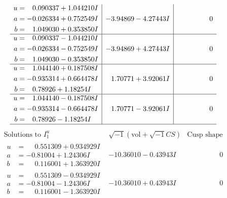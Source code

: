 \documentclass[1p]{elsarticle_modified}
\theoremstyle{definition}
\newcommand{\I}{\sqrt{-1}}
\begin{document}
$$\begin{array}{c|c|c}
\begin{aligned}
u &= \phantom{-}0.090337 + 1.044210 I \\
a &= -0.026334 + 0.752549 I \\
b &= \phantom{-}1.049030 + 0.353850 I\end{aligned}
 & -3.94869 - 4.27443 I & \phantom{-0.000000 } 0 \\ \hline\begin{aligned}
u &= \phantom{-}0.090337 - 1.044210 I \\
a &= -0.026334 - 0.752549 I \\
b &= \phantom{-}1.049030 - 0.353850 I\end{aligned}
 & -3.94869 + 4.27443 I & \phantom{-0.000000 } 0 \\ \hline\begin{aligned}
u &= \phantom{-}1.044140 + 0.187508 I \\
a &= -0.935314 + 0.664478 I \\
b &= \phantom{-}0.78926 + 1.18254 I\end{aligned}
 & \phantom{-}1.70771 + 3.92061 I & \phantom{-0.000000 } 0 \\ \hline\begin{aligned}
u &= \phantom{-}1.044140 - 0.187508 I \\
a &= -0.935314 - 0.664478 I \\
b &= \phantom{-}0.78926 - 1.18254 I\end{aligned}
 & \phantom{-}1.70771 - 3.92061 I & \phantom{-0.000000 } 0\\
 \hline 
 \end{array}$$\newpage$$\begin{array}{c|c|c}  
\text{Solutions to }I^u_{1}& \I (\text{vol} + \sqrt{-1}CS) & \text{Cusp shape}\\
 \hline 
\begin{aligned}
u &= \phantom{-}0.551309 + 0.934929 I \\
a &= -0.81004 + 1.24306 I \\
b &= \phantom{-}0.116001 + 1.363920 I\end{aligned}
 & -10.36010 - 0.43943 I & \phantom{-0.000000 } 0 \\ \hline\begin{aligned}
u &= \phantom{-}0.551309 - 0.934929 I \\
a &= -0.81004 - 1.24306 I \\
b &= \phantom{-}0.116001 - 1.363920 I\end{aligned}
 & -10.36010 + 0.43943 I & \phantom{-0.000000 } 0 \\ \hline\begin{aligned}

\end{aligned}
\end{array}$$
\end{document}
